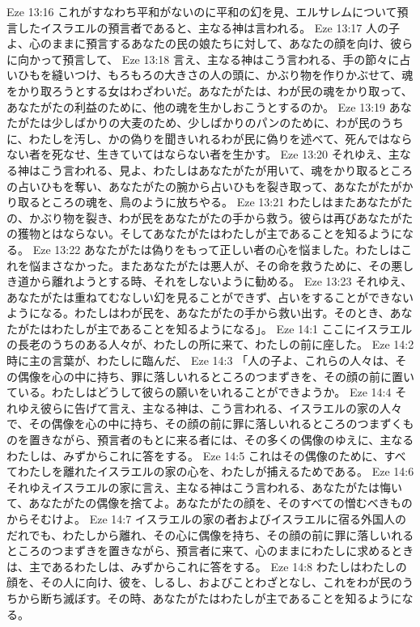 Eze 13:16  これがすなわち平和がないのに平和の幻を見、エルサレムについて預言したイスラエルの預言者であると、主なる神は言われる。
Eze 13:17  人の子よ、心のままに預言するあなたの民の娘たちに対して、あなたの顔を向け、彼らに向かって預言して、
Eze 13:18  言え、主なる神はこう言われる、手の節々に占いひもを縫いつけ、もろもろの大きさの人の頭に、かぶり物を作りかぶせて、魂をかり取ろうとする女はわざわいだ。あなたがたは、わが民の魂をかり取って、あなたがたの利益のために、他の魂を生かしおこうとするのか。
Eze 13:19  あなたがたは少しばかりの大麦のため、少しばかりのパンのために、わが民のうちに、わたしを汚し、かの偽りを聞きいれるわが民に偽りを述べて、死んではならない者を死なせ、生きていてはならない者を生かす。
Eze 13:20  それゆえ、主なる神はこう言われる、見よ、わたしはあなたがたが用いて、魂をかり取るところの占いひもを奪い、あなたがたの腕から占いひもを裂き取って、あなたがたがかり取るところの魂を、鳥のように放ちやる。
Eze 13:21  わたしはまたあなたがたの、かぶり物を裂き、わが民をあなたがたの手から救う。彼らは再びあなたがたの獲物とはならない。そしてあなたがたはわたしが主であることを知るようになる。
Eze 13:22  あなたがたは偽りをもって正しい者の心を悩ました。わたしはこれを悩まさなかった。またあなたがたは悪人が、その命を救うために、その悪しき道から離れようとする時、それをしないように勧める。
Eze 13:23  それゆえ、あなたがたは重ねてむなしい幻を見ることができず、占いをすることができないようになる。わたしはわが民を、あなたがたの手から救い出す。そのとき、あなたがたはわたしが主であることを知るようになる」。
Eze 14:1  ここにイスラエルの長老のうちのある人々が、わたしの所に来て、わたしの前に座した。
Eze 14:2  時に主の言葉が、わたしに臨んだ、
Eze 14:3  「人の子よ、これらの人々は、その偶像を心の中に持ち、罪に落しいれるところのつまずきを、その顔の前に置いている。わたしはどうして彼らの願いをいれることができようか。
Eze 14:4  それゆえ彼らに告げて言え、主なる神は、こう言われる、イスラエルの家の人々で、その偶像を心の中に持ち、その顔の前に罪に落しいれるところのつまずくものを置きながら、預言者のもとに来る者には、その多くの偶像のゆえに、主なるわたしは、みずからこれに答をする。
Eze 14:5  これはその偶像のために、すべてわたしを離れたイスラエルの家の心を、わたしが捕えるためである。
Eze 14:6  それゆえイスラエルの家に言え、主なる神はこう言われる、あなたがたは悔いて、あなたがたの偶像を捨てよ。あなたがたの顔を、そのすべての憎むべきものからそむけよ。
Eze 14:7  イスラエルの家の者およびイスラエルに宿る外国人のだれでも、わたしから離れ、その心に偶像を持ち、その顔の前に罪に落しいれるところのつまずきを置きながら、預言者に来て、心のままにわたしに求めるときは、主であるわたしは、みずからこれに答をする。
Eze 14:8  わたしはわたしの顔を、その人に向け、彼を、しるし、およびことわざとなし、これをわが民のうちから断ち滅ぼす。その時、あなたがたはわたしが主であることを知るようになる。
